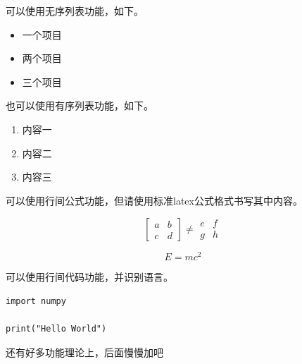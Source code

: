 \documentclass{ctexart} %
\begin{document}
可以使用无序列表功能，如下。

\begin{itemize}
    \item 一个项目
    \item 两个项目
    \item 三个项目
\end{itemize}

也可以使用有序列表功能，如下。

\begin{enumerate}
    \item 内容一
    \item 内容二
    \item 内容三
\end{enumerate}

可以使用行间公式功能，但请使用标准latex公式格式书写其中内容。

\begin{equation}
    \begin{bmatrix}
    a & b \\ c & d
    \end{bmatrix}
    \neq
    \begin{matrix}
    e & f \\ g & h
    \end{matrix}
    \label{eq:1}
\end{equation}

\begin{equation}
    E=mc^2
\end{equation}

可以使用行间代码功能，并识别语言。

\begin{verbatim}
import numpy

print("Hello World")
\end{verbatim}

还有好多功能理论上，后面慢慢加吧




\clearpage

\end{document}
